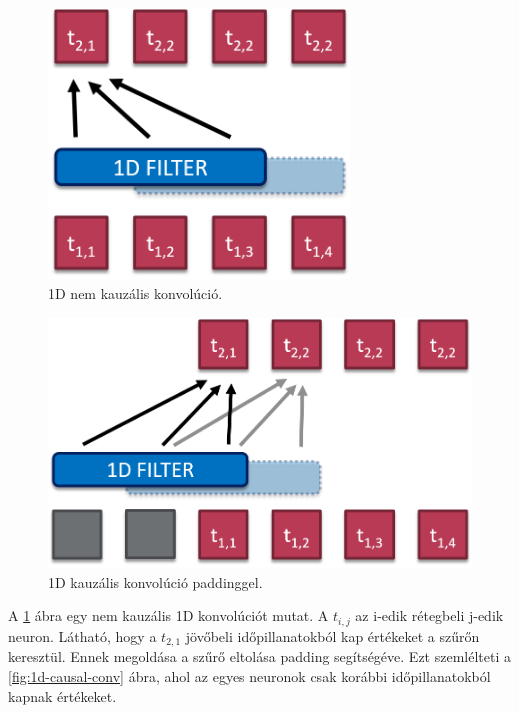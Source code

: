 \begin{figure}[!ht]
	\centering
	\includegraphics[width=80mm, keepaspectratio]{figures/1d-conv.png}
	\caption{1D nem kauzális konvolúció.}
	\label{fig:1d_noncausal_conv}
\end{figure}

\begin{figure}[!ht]
	\centering
	\includegraphics[width=120mm, keepaspectratio]{figures/1d-causal-conv.png}
	\caption{1D kauzális konvolúció paddinggel.}
	\label{fig:1d_causal_conv}
\end{figure}

\newpage

A \ref{fig:1d_noncausal_conv} ábra egy nem kauzális 1D konvolúciót mutat. A $t_{i, j}$ az i-edik rétegbeli j-edik neuron. Látható, hogy a $t_{2,1}$ jövőbeli időpillanatokból kap értékeket a szűrőn keresztül. Ennek megoldása a szűrő eltolása padding segítségéve. Ezt szemlélteti a \ref{fig:1d-causal-conv} ábra, ahol az egyes neuronok csak korábbi időpillanatokból kapnak értékeket. 

